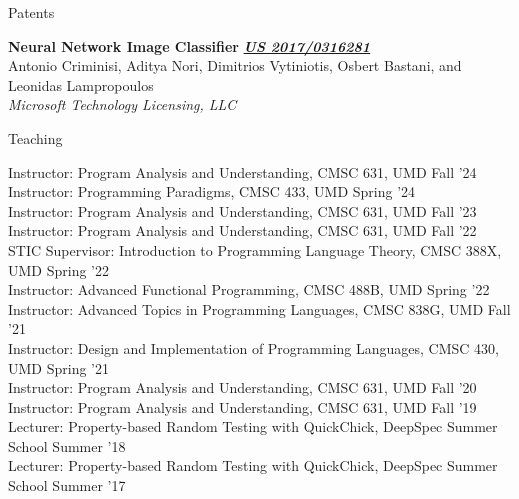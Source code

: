 \documentclass{resume} %
\begin{document}

\begin{rSection}{Patents}

{\bf Neural Network Image Classifier} \hfill {\href{https://patentimages.storage.googleapis.com/44/ec/9f/3f90c94a602fda/US20170316281A1.pdf}{\bf \em US 2017/0316281}}\\
Antonio Criminisi, Aditya Nori, Dimitrios Vytiniotis, Osbert Bastani, and Leonidas Lampropoulos\\
{\em Microsoft Technology Licensing, LLC}

  
\end{rSection}


\newcommand{\teach}[3]{
  {#1: #2} \hfill #3 \\
  }

\begin{rSection}{Teaching}

  \teach{Instructor}{Program Analysis and Understanding, CMSC 631, UMD}{Fall '24}  
  \teach{Instructor}{Programming Paradigms, CMSC 433, UMD}{Spring '24}
  \teach{Instructor}{Program Analysis and Understanding, CMSC 631, UMD}{Fall '23}    
  \teach{Instructor}{Program Analysis and Understanding, CMSC 631, UMD}{Fall '22}  
  \teach{STIC Supervisor}{Introduction to Programming Language Theory, CMSC 388X, UMD}{Spring '22}  
  \teach{Instructor}{Advanced Functional Programming, CMSC 488B, UMD}{Spring '22}  
  \teach{Instructor}{Advanced Topics in Programming Languages, CMSC 838G, UMD}{Fall '21}
  \teach{Instructor}{Design and Implementation of Programming Languages, CMSC 430, UMD}{Spring '21}  
  \teach{Instructor}{Program Analysis and Understanding, CMSC 631, UMD}{Fall '20}
  \teach{Instructor}{Program Analysis and Understanding, CMSC 631, UMD}{Fall '19}
  \teach{Lecturer}{Property-based Random Testing with QuickChick, DeepSpec Summer School}{Summer '18}
  \teach{Lecturer}{Property-based Random Testing with QuickChick, DeepSpec Summer School}{Summer '17}  
  
\end{rSection}
\end{document}
